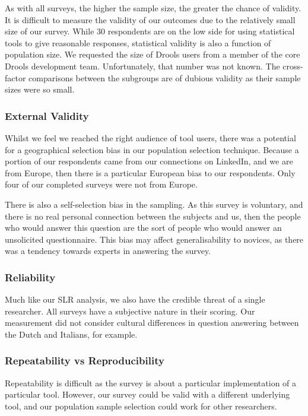 As with all surveys, the higher the sample size, the greater the chance of validity.
It is difficult to measure the validity of our outcomes due to the relatively small size of our survey.
While 30 respondents are on the low side for using statistical tools to give reasonable responses, statistical validity is also a function of population size.
We requested the size of Drools users from a member of the core Drools development team.  
Unfortunately, that number was not known.
The cross-factor comparisons between the subgroups are of dubious validity as their sample sizes were so small.

\subsubsection{External Validity}
Whilst we feel we reached the right audience of tool users, there was a potential for a geographical selection bias in our population selection technique.
Because a portion of our respondents came from our connections on LinkedIn, and we are from Europe, then there is a particular European bias to our respondents.
Only four of our completed surveys were not from Europe.

There is also a self-selection bias in the sampling. 
As this survey is voluntary, and there is no real personal connection between the subjects and us, then the people who would answer this question are the sort of people who would answer an unsolicited questionnaire.
This bias may affect generalisability to novices, as there was a tendency towards experts in answering the survey.

\subsubsection{Reliability}
Much like our SLR analysis, we also have the credible threat of a single researcher.
All surveys have a subjective nature in their scoring.
Our measurement did not consider cultural differences in question answering between the Dutch and Italians, for example.

\subsubsection{Repeatability vs Reproducibility}
Repeatability is difficult as the survey is about a particular implementation of a particular tool.
However, our survey could be valid with a different underlying tool, and our population sample selection could work for other researchers.

